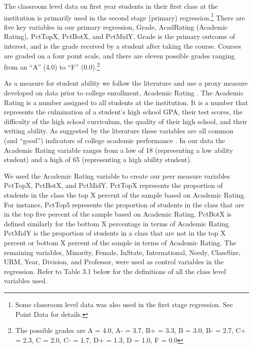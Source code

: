 \documentclass[12pt,a4paper,english,fleqn]{article}
\begin{document}

The classroom level data on first year students in their first class at the institution is primarily used in the second stage (primary) regression.\footnote{Some classroom level data was also used in the first stage regression. See Point Data for details.}
There are five key variables in our primary regression, Grade, AcadRating (Academic Rating), PctTopX, PctBotX, and PctMidY. 
Grade is the primary outcome of interest, and is the grade received by a student after taking the course. 
Courses are graded on a four point scale, and there are eleven possible grades ranging from an ``A'' (4.0) to ``F'' (0.0).\footnote{The possible grades are A = 4.0, A- = 3.7, B+ = 3.3, B = 3.0, B- = 2.7, C+ = 2.3, C = 2.0, C- = 1.7, D+ = 1.3, D = 1.0, F = 0.0} 

As a measure for student ability we follow the literature and use a proxy measure developed on data prior to college enrollment, Academic Rating \citep{griffith2014peer}. 
The Academic Rating is a number assigned to all students at the institution. 
It is a number that represents the culmination of a student's high school GPA, their test scores, the difficulty of the high school curriculum, the quality of their high school, and their writing ability. 
As suggested by the literature these variables are all common (and ``good'') indicators of college academic performance \citep{betts2003determinants,dooley2012persistence}.
In our data the Academic Rating variable ranges from a low of 18 (representing a low ability student) and a high of 65 (representing a high ability student).

We used the Academic Rating variable to create our peer measure variables PctTopX, PctBotX, and PctMidY. PctTopX represents the proportion of students in the class the top X percent of the sample based on Academic Rating. 
For instance, PctTop5 represents the proportion of students in the class that are in the top five percent of the sample based on Academic Rating. 
PctBotX is defined similarly for the bottom X percentage in terms of Academic Rating. 
PctMidY is the proportion of students in a class that are not in the top X percent or bottom X percent of the sample in terms of Academic Rating. 
The remaining variables, Minority, Female, InState, International, Needy, ClassSize, URM, Year, Division, and Professor, were used as control variables in the regression.
Refer to Table 3.1 below for the definitions of all the class level variables used. 
\end{document}
